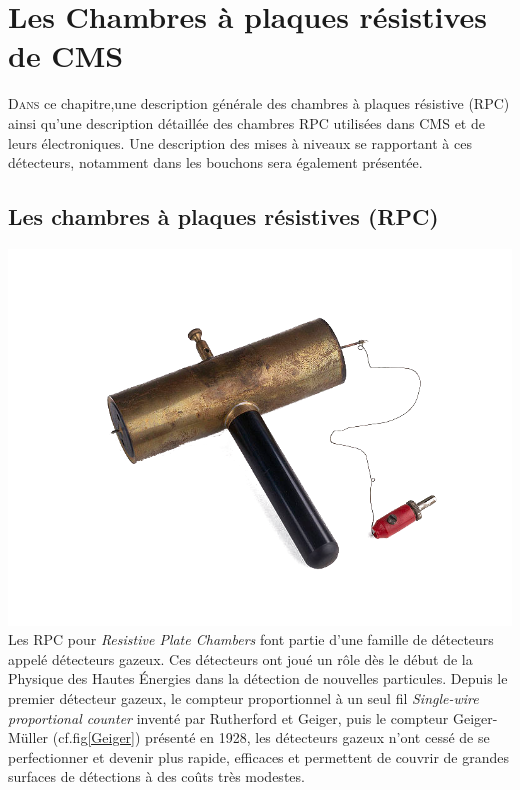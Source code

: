\chapter{Les Chambres à plaques résistives de CMS}
\renewcommand\chapterillustration{RPC/rpc}
\ThisULCornerWallPaper{1}{\chapterillustration}
\minitoc

\lettrine[lines=4, slope=-0.5em]{D}{ans} ce chapitre,une description générale des chambres à plaques résistive (RPC) ainsi qu'une description détaillée des chambres RPC utilisées dans CMS et de leurs électroniques. Une description des mises à niveaux se rapportant à ces détecteurs, notamment dans les bouchons sera également présentée.

\section{Les chambres à plaques résistives (RPC)}

 \marginpar
{
	\centering
	\includegraphics[width=\marginparwidth]{RPC/Geiger.png}
	\label{Geiger}
}
Les RPC pour \textit{Resistive Plate Chambers} font partie d'une famille de détecteurs appelé détecteurs gazeux. Ces détecteurs ont joué un rôle dès le début de la Physique des Hautes Énergies dans la détection de nouvelles particules. Depuis le premier détecteur gazeux, le compteur proportionnel à un seul fil \textit{Single-wire proportional counter} inventé par Rutherford et Geiger, puis le compteur Geiger-Müller (cf.fig\ref{Geiger}) présenté en 1928, les détecteurs gazeux n'ont cessé de se perfectionner et devenir plus rapide, efficaces et permettent de couvrir de grandes surfaces de détections à des coûts très modestes.


